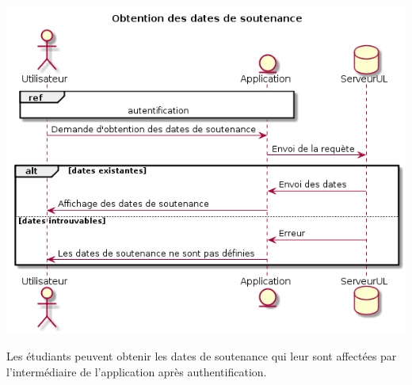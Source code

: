 \documentclass{scrreprt}
\begin{document}
\begin{center}
	\includegraphics[scale=0.55]{image/obtentionDatesSoutenance.png}
\end{center}
\hspace{1cm}Les étudiants peuvent obtenir les dates de soutenance qui leur sont affectées par l'intermédiaire de l'application après authentification.
\end{document}
